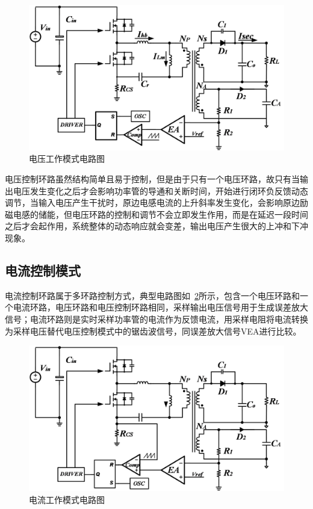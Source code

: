 \begin{figure}[htbp] 
    \centering
    \includegraphics[width=0.8\linewidth]{figures/电压工作模式电路图.png}
    \caption{电压工作模式电路图}
    \label{fig:电压工作模式电路图}
\end{figure}

电压控制环路虽然结构简单且易于控制，但是由于只有一个电压环路，故只有当输出电压发生变化之后才会影响功率管的导通和关断时间，开始进行闭环负反馈动态调节，当输入电压产生干扰时，原边电感电流的上升斜率发生变化，会影响原边励磁电感的储能，但电压环路的控制和调节不会立即发生作用，而是在延迟一段时间之后才会起作用，系统整体的动态响应就会变差，输出电压产生很大的上冲和下冲现象。

\subsection{电流控制模式}

电流控制环路属于多环路控制方式，典型电路图如~\ref{fig:电流工作模式电路图}所示，包含一个电压环路和一个电流环路，电压环路和电压控制环路相同，采样输出电压信号用于生成误差放大信号；电流环路则是实时采样功率管的电流作为反馈电流，用采样电阻将电流转换为采样电压替代电压控制模式中的锯齿波信号，同误差放大信号VEA进行比较。

\begin{figure}[htbp] 
    \centering
    \includegraphics[width=0.8\linewidth]{figures/电流工作模式电路图.png}
    \caption{电流工作模式电路图}
    \label{fig:电流工作模式电路图}
\end{figure}

